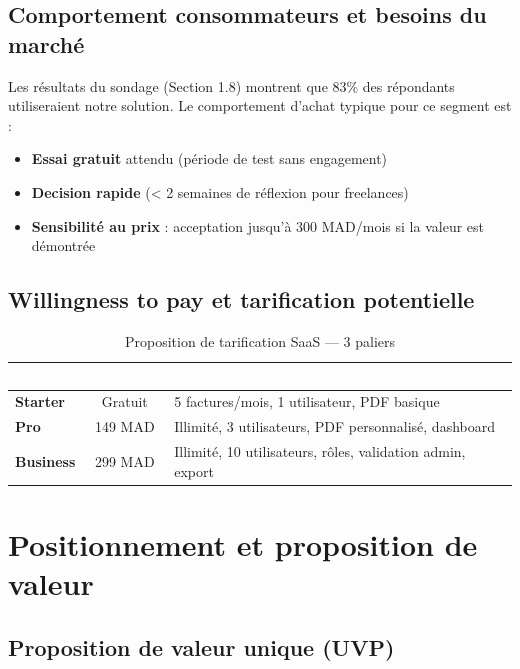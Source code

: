 \documentclass[12pt,a4paper]{report}
\begin{document}
\subsection{Comportement consommateurs et besoins du marché}

Les résultats du sondage (Section 1.8) montrent que 83\% des répondants utiliseraient notre solution. Le comportement d'achat typique pour ce segment est :
\begin{itemize}
    \item \textbf{Essai gratuit} attendu (période de test sans engagement)
    \item \textbf{Decision rapide} (< 2 semaines de réflexion pour freelances)
    \item \textbf{Sensibilité au prix} : acceptation jusqu'à 300 MAD/mois si la valeur est démontrée
\end{itemize}

\subsection{Willingness to pay et tarification potentielle}

\begin{table}[H]
\centering
\caption{Proposition de tarification SaaS — 3 paliers}
\label{tab:tarification}
\begin{tabular}{|l|c|l|}
\hline
\rowcolor{emsiblue}\textcolor{white}{\textbf{Plan}} & \textcolor{white}{\textbf{Prix/mois}} & \textcolor{white}{\textbf{Fonctionnalités clés}} \\
\hline
\textbf{Starter} & Gratuit & 5 factures/mois, 1 utilisateur, PDF basique \\
\textbf{Pro} & 149 MAD & Illimité, 3 utilisateurs, PDF personnalisé, dashboard \\
\textbf{Business} & 299 MAD & Illimité, 10 utilisateurs, rôles, validation admin, export \\
\hline
\end{tabular}
\end{table}

\section{Positionnement et proposition de valeur}

\subsection{Proposition de valeur unique (UVP)}
\end{document}
